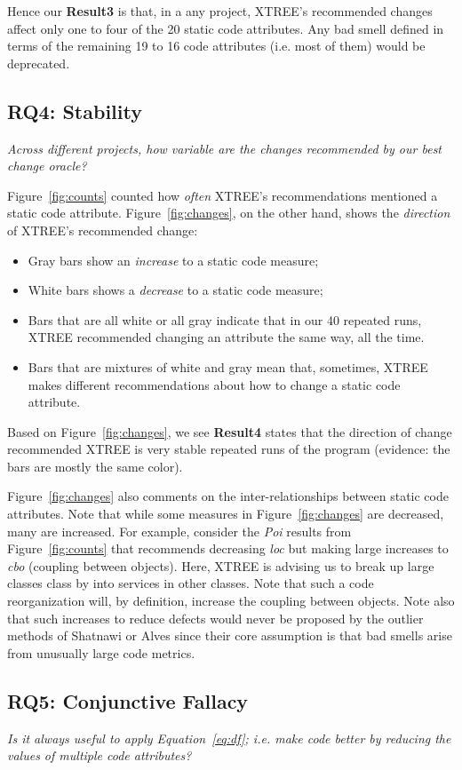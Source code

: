 \documentclass[twocolumn,5p]{elsarticle}
\newcommand{\bi}{\begin{itemize}[leftmargin=0.4cm]}
\newcommand{\ei}{\end{itemize}}
\newcommand{\fig}[1]{Figure~\ref{fig:#1}}
\newcommand{\eq}[1]{Equation~\ref{eq:#1}}
\theoremstyle{break}
\begin{document}
	Hence our {\bf Result3} is that, in a any  project,  XTREE's  recommended  
	changes affect only one to four of the 20 static code attributes.  Any bad 
	smell defined in terms of the remaining 19 to 16 code attributes (i.e. 
	most 
	of them) would be deprecated.
	
	
	\subsection{RQ4: Stability}
	
	{\em Across different projects, how variable are the changes recommended by 
	our best change oracle? }
	
	
	\fig{counts} counted how {\em often} XTREE's recommendations mentioned a 
	static code attribute.
	\fig{changes}, on the other hand, shows the {\em direction} of XTREE's 
	recommended change:
	\bi
	\item Gray bars show  an  {\em increase} to a static code measure;
	\item White bars shows a   {\em decrease} to a static code measure;
	\item Bars that are all white or all gray indicate that in our 40 repeated 
	runs, XTREE recommended changing an attribute the same way, all the time.
	\item Bars that are mixtures of white and gray mean that, sometimes, XTREE 
	makes different recommendations about how to change a static
	code attribute.
	\ei
	Based on \fig{changes}, we see {\bf Result4} states that the direction of 
	change recommended  XTREE is  very stable repeated runs of the program  
	(evidence:
	the bars are mostly the same color).
	
	\fig{changes} also comments on the inter-relationships between static code 
	attributes. Note that while some measures in
	\fig{changes} are decreased, many are increased.
	For example, consider the {\em Poi} results
	from \fig{counts} that recommends decreasing {\em loc}
	but making large increases to {\em cbo} (coupling between
	objects). Here, XTREE is advising us to break up
	large classes class by into services
	in other classes. Note that such a code reorganization will, by
	definition, increase the coupling between objects.
	Note also that such increases  to reduce
	defects would never be proposed by the outlier methods
	of Shatnawi or Alves since their core assumption is that bad
	smells arise from unusually large code metrics.
	
	\subsection{RQ5: Conjunctive Fallacy}
	\label{sect:conjunct}
	{\em  Is  it  always  useful  to  apply \eq{df};  i.e.   make  code  
	better  by  reducing  the  values  of multiple code attributes?}
	
\end{document}
